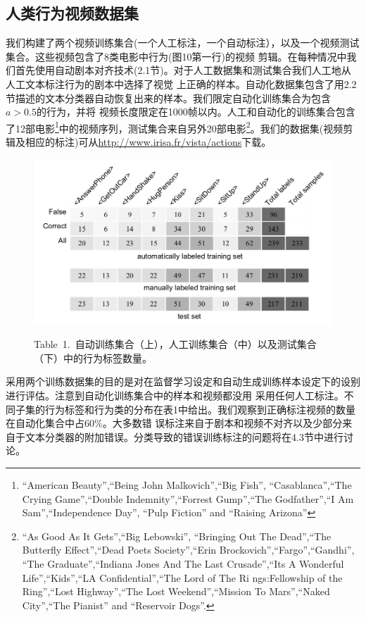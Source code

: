 \documentclass[10pt,twocolumn,letterpaper]{article}
\begin{document}
\subsection{人类行为视频数据集}
我们构建了两个视频训练集合(一个人工标注，一个自动标注），以及一个视频测试集合。这些视频包含了8类电影中行为(图10第一行)的视频
剪辑。在每种情况中我们首先使用自动剧本对齐技术(2.1节)。对于人工数据集和测试集合我们人工地从人工文本标注行为的剧本中选择了视觉
上正确的样本。自动化数据集包含了用2.2节描述的文本分类器自动恢复出来的样本。我们限定自动化训练集合为包含$a > 0.5$的行为，并将
视频长度限定在1000帧以内。人工和自动化的训练集合包含了12部电影\footnote{``American Beauty'',``Being John Malkovich'',``Big Fish'',
``Casablanca'',``The Crying Game'',``Double Indemnity'',``Forrest Gump'',``The Godfather'',``I Am Sam'',``Independence Day'',
``Pulp Fiction'' and ``Raising Arizona''}中的视频序列，测试集合来自另外20部电影\footnote{``As Good As It Gets'',``Big Lebowski'',
``Bringing Out The Dead'',``The Butterfly Effect'',``Dead Poets Society'',``Erin Brockovich'',``Fargo'',``Gandhi'',
 ``The Graduate'',``Indiana Jones And The Last Crusade'',``Its A Wonderful Life'',``Kids'',``LA Confidential'',``The Lord of The Ri
 ngs:Fellowship of the Ring'',``Lost Highway'',``The Lost Weekend'',``Mission To Mars'',``Naked City'',``The Pianist'' and 
 ``Reservoir Dogs''.}。我们的数据集(视频剪辑及相应的标注)可从\url{http://www.irisa.fr/vista/actions}下载。

\begin{figure}[h]
   \includegraphics[width=1.0\linewidth]{table1.png}

  Table~1.~自动训练集合（上），人工训练集合（中）以及测试集合（下）中的行为标签数量。
\end{figure}

采用两个训练数据集的目的是对在监督学习设定和自动生成训练样本设定下的设别进行评估。注意到自动化训练集合中的样本和视频都没用
采用任何人工标注。不同子集的行为标签和行为类的分布在表1中给出。我们观察到正确标注视频的数量在自动化集合中占$60\%$。大多数错
误标注来自于剧本和视频不对齐以及少部分来自于文本分类器的附加错误。分类导致的错误训练标注的问题将在4.3节中进行讨论。
\end{document}
